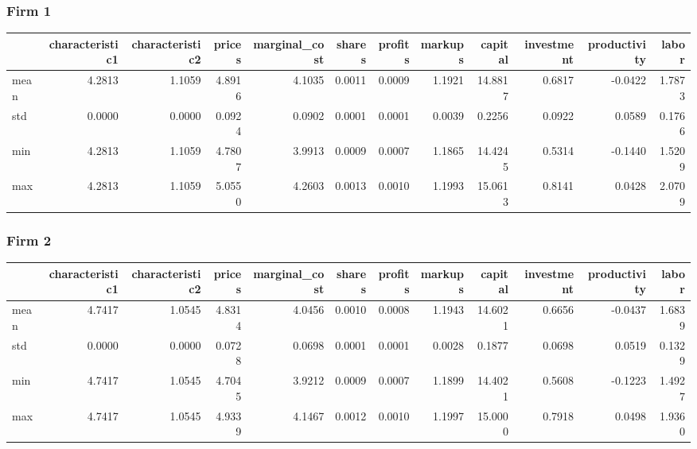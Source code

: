  \subsubsection*{Firm 1}
\begin{tabular}{lrrrrrrrrrrr}
\toprule
{} &  characteristic1 &  characteristic2 &  prices &  marginal\_cost &  shares &  profits &  markups &  capital &  investment &  productivity &  labor \\
\midrule
mean &           4.2813 &           1.1059 &  4.8916 &         4.1035 &  0.0011 &   0.0009 &   1.1921 &  14.8817 &      0.6817 &       -0.0422 & 1.7873 \\
std  &           0.0000 &           0.0000 &  0.0924 &         0.0902 &  0.0001 &   0.0001 &   0.0039 &   0.2256 &      0.0922 &        0.0589 & 0.1766 \\
min  &           4.2813 &           1.1059 &  4.7807 &         3.9913 &  0.0009 &   0.0007 &   1.1865 &  14.4245 &      0.5314 &       -0.1440 & 1.5209 \\
max  &           4.2813 &           1.1059 &  5.0550 &         4.2603 &  0.0013 &   0.0010 &   1.1993 &  15.0613 &      0.8141 &        0.0428 & 2.0709 \\
\bottomrule
\end{tabular}


 \subsubsection*{Firm 2}
\begin{tabular}{lrrrrrrrrrrr}
\toprule
{} &  characteristic1 &  characteristic2 &  prices &  marginal\_cost &  shares &  profits &  markups &  capital &  investment &  productivity &  labor \\
\midrule
mean &           4.7417 &           1.0545 &  4.8314 &         4.0456 &  0.0010 &   0.0008 &   1.1943 &  14.6021 &      0.6656 &       -0.0437 & 1.6839 \\
std  &           0.0000 &           0.0000 &  0.0728 &         0.0698 &  0.0001 &   0.0001 &   0.0028 &   0.1877 &      0.0698 &        0.0519 & 0.1329 \\
min  &           4.7417 &           1.0545 &  4.7045 &         3.9212 &  0.0009 &   0.0007 &   1.1899 &  14.4021 &      0.5608 &       -0.1223 & 1.4927 \\
max  &           4.7417 &           1.0545 &  4.9339 &         4.1467 &  0.0012 &   0.0010 &   1.1997 &  15.0000 &      0.7918 &        0.0498 & 1.9360 \\
\bottomrule
\end{tabular}


